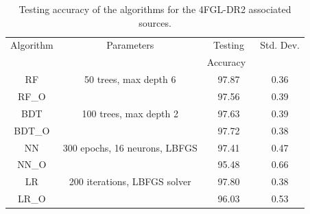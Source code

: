 \documentclass{aa}
\begin{document}
\begin{table}[!h]
    \caption{Testing accuracy of the algorithms for the 4FGL-DR2 associated sources. }
    \label{tab:selected_algs2}

\centering
    \tiny
    \renewcommand{\tabcolsep}{0.4mm}
\renewcommand{\arraystretch}{1.6}

    \begin{tabular}{ c c c c }
    \hline
    \hline
    Algorithm&Parameters &  Testing&Std. Dev.\\
    & & Accuracy\ &  \\
    \hline
    RF& 50 trees, max depth 6  &97.87 & 0.36\\
    RF\_O   &&97.56&0.39 \\
    \hline
    BDT & 100 trees, max depth 2    &   97.63 &0.39\\
    BDT\_O&&97.72&0.38\\
    \hline
    NN & 300 epochs, 16 neurons, LBFGS  & 97.41 & 0.47\\
    NN\_O&&95.48&0.66\\
    \hline
    LR & 200 iterations, LBFGS solver & 97.80&0.38\\
    LR\_O&&96.03&0.53\\
    \hline
     
    \end{tabular}%
\end{table}
\end{document}
